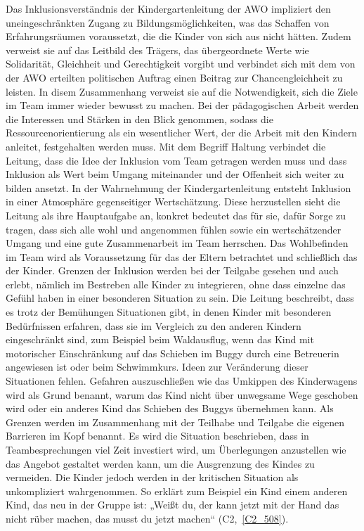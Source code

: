 Das Inklusionsverständnis der Kindergartenleitung der AWO impliziert den uneingeschränkten Zugang zu Bildungsmöglichkeiten, was das Schaffen von Erfahrungsräumen voraussetzt, die die Kinder von sich aus nicht hätten. Zudem verweist sie auf das Leitbild des Trägers, das übergeordnete Werte wie Solidarität, Gleichheit und Gerechtigkeit vorgibt und verbindet sich mit dem von der AWO erteilten politischen Auftrag einen Beitrag zur Chancengleichheit zu leisten. In disem Zusammenhang verweist sie auf die Notwendigkeit, sich die Ziele im Team immer wieder bewusst zu machen. Bei der pädagogischen Arbeit werden die Interessen und Stärken in den Blick genommen, sodass die Ressourcenorientierung als ein wesentlicher Wert, der die Arbeit mit den Kindern anleitet, festgehalten werden muss. 
Mit dem Begriff Haltung verbindet die Leitung, dass die Idee der Inklusion vom Team getragen werden muss und dass Inklusion als Wert  beim Umgang miteinander und der Offenheit sich weiter zu bilden ansetzt. In der Wahrnehmung der Kindergartenleitung entsteht Inklusion in einer Atmosphäre gegenseitiger Wertschätzung. Diese herzustellen sieht die Leitung als ihre Hauptaufgabe an, konkret bedeutet das für sie, dafür Sorge zu tragen, dass sich alle wohl und angenommen fühlen sowie ein wertschätzender Umgang und eine gute Zusammenarbeit im Team herrschen. Das Wohlbefinden im Team wird als Voraussetzung für das der Eltern betrachtet und schließlich das der Kinder. 
Grenzen der Inklusion werden bei der Teilgabe gesehen und auch erlebt, nämlich im Bestreben alle Kinder zu integrieren, ohne dass einzelne das Gefühl haben in einer besonderen Situation zu sein.    
Die Leitung beschreibt, dass es trotz der Bemühungen Situationen gibt, in denen Kinder mit besonderen Bedürfnissen erfahren, dass sie im Vergleich zu den anderen Kindern eingeschränkt sind, zum Beispiel beim Waldausflug, wenn das Kind mit motorischer Einschränkung auf das Schieben im Buggy durch eine Betreuerin angewiesen ist oder beim Schwimmkurs. Ideen zur Veränderung dieser Situationen fehlen. Gefahren auszuschließen wie das Umkippen des Kinderwagens wird als Grund benannt, warum das Kind nicht über unwegsame Wege geschoben wird oder ein anderes Kind das Schieben des Buggys übernehmen kann. Als Grenzen werden im Zusammenhang mit der Teilhabe und Teilgabe die eigenen Barrieren im Kopf benannt. Es wird die Situation beschrieben, dass in Teambesprechungen viel Zeit investiert wird, um Überlegungen anzustellen wie das Angebot gestaltet werden kann, um die Ausgrenzung des Kindes zu vermeiden. Die Kinder jedoch werden in der kritischen Situation als unkompliziert wahrgenommen. So erklärt zum Beispiel ein Kind einem anderen Kind, das neu in der Gruppe ist: „Weißt du, der kann jetzt mit der Hand das nicht rüber machen, das musst du jetzt machen“ (C2,~\ref{C2_508}).
